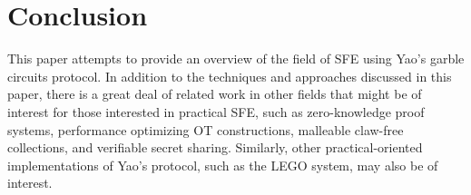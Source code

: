 \section{Conclusion}
\label{sec:conclusion}

This paper attempts to provide an overview of the field of \ac{SFE} using Yao's garble circuits protocol.  In addition to the techniques and approaches discussed in this paper, there is a great deal of related work in other fields that might be of interest for those interested in practical \ac{SFE}, such as zero-knowledge proof systems, performance optimizing \ac{OT} constructions, malleable claw-free collections, and verifiable secret sharing. Similarly, other practical-oriented implementations of Yao's protocol, such as the LEGO system\cite{nielsen2009lego}, may also be of interest.
